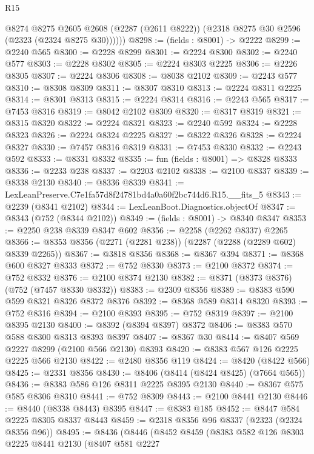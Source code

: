\begin{lexlean}{R15}
\begin{coremodule}
        @8274
          @8275
          @2605
          @2608
          (@2287 (@2611 @8222))
          (@2318 @8275 @30 @2596 (@2323 (@2324 @8275 @30))))))
@8298 := (fields : @8001) -> @2222
@8299 := @2240 @565
@8300 := @2228 @8299
@8301 := @2224 @8300
@8302 := @2240 @577
@8303 := @2228 @8302
@8305 := @2224 @8303 @2225
@8306 := @2226 @8305
@8307 := @2224 @8306
@8308 := @8038 @2102
@8309 := @2243 @577
@8310 := @8308 @8309
@8311 := @8307 @8310
@8313 := @2224 @8311 @2225
@8314 := @8301 @8313
@8315 := @2224 @8314
@8316 := @2243 @565
@8317 := @7453 @8316
@8319 := @8042 @2102 @8309
@8320 := @8317 @8319
@8321 := @8315 @8320
@8322 := @2224 @8321
@8323 := @2240 @592
@8324 := @2228 @8323
@8326 := @2224 @8324 @2225
@8327 := @8322 @8326
@8328 := @2224 @8327
@8330 := @7457 @8316 @8319
@8331 := @7453 @8330
@8332 := @2243 @592
@8333 := @8331 @8332
@8335 := fun (fields : @8001) => @8328 @8333
@8336 := @2233 @238
@8337 := @2203 @2102
@8338 := @2100 @8337
@8339 := @8338 @2130
@8340 := @8336 @8339
@8341 := LexLeanPreserve.C7e1fa57d8f24781bd4a0a60f2bc744d6.R15.__fits_5
@8343 := @2239 (@8341 @2102)
@8344 := LexLeanBoot.Diagnostics.objectOf
@8347 := @8343 (@752 (@8344 @2102))
@8349 := (fields : @8001) -> @8340 @8347
@8353 := @2250 @238 @8339 @8347 @602
@8356 := @2258 (@2262 @8337) @2265
@8366 := @8353 @8356 (@2271 (@2281 @238)) (@2287 (@2288 (@2289 @602) @8339 @2265))
@8367 := @3818 @8356
@8368 := @8367 @394
@8371 := @8368 @600 @8327 @8333
@8372 := @752 @8330
@8373 := @2100 @8372
@8374 := @752 @8332
@8376 := @2100 @8374 @2130
@8382 := @8371 (@8373 @8376) (@752 (@7457 @8330 @8332))
@8383 := @2309 @8356
@8389 := @8383 @590 @599 @8321 @8326 @8372 @8376
@8392 := @8368 @589 @8314 @8320
@8393 := @752 @8316
@8394 := @2100 @8393
@8395 := @752 @8319
@8397 := @2100 @8395 @2130
@8400 := @8392 (@8394 @8397) @8372
@8406 := @8383 @570 @588 @8300 @8313 @8393 @8397
@8407 := @8367 @30
@8414 := @8407 @569 @2227 @8299 (@2100 @566 @2130) @8393
@8420 := @8383 @567 @126 @2225 @2225 @566 @2130
@8422 := @2480 @8356 @119
@8424 := @8420 (@8422 @566)
@8425 := @2331 @8356
@8430 := @8406 (@8414 (@8424 @8425) (@7664 @565))
@8436 := @8383 @586 @126 @8311 @2225 @8395 @2130
@8440 := @8367 @575 @585 @8306 @8310
@8441 := @752 @8309
@8443 := @2100 @8441 @2130
@8446 := @8440 (@8338 @8443) @8395
@8447 := @8383 @185
@8452 := @8447 @584 @2225 @8305 @8337 @8443
@8459 := @2318 @8356 @96 @8337 (@2323 (@2324 @8356 @96))
@8495 := @8436
    (@8446
      (@8452
        @8459
        (@8383
          @582
          @126
          @8303
          @2225
          @8441
          @2130
          (@8407
            @581
            @2227

\end{coremodule}
\end{lexlean}
